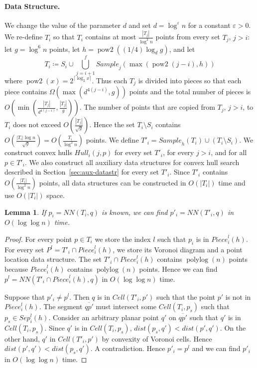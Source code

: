 \documentclass[12pt,a4paper,USenglish,cleveref, autoref, thm-restate]{article}
\newcommand{\ov}[1]{\overline{#1}}
\newcommand{\Cell}{\mathit{Cell}}
\newcommand{\Sample}{\mathit{Sample}}
\newcommand{\Piece}{\mathit{Piece}}
\newcommand{\Sep}{\mathit{Sep}}
\newcommand{\Hull}{\mathit{Hull}}
\newcommand{\NN}{\mathit{NN}}
\newcommand{\eps}{\varepsilon}
\newcommand{\john}[1]{\textcolor{red}{#1}}
\newtheorem{lemma}{Lemma}
\newcommand{\ov}[1]{\overline{#1}}
\newcommand{\Cell}{\mathit{Cell}}
\newcommand{\Sample}{\mathit{Sample}}
\newcommand{\Piece}{\mathit{Piece}}
\newcommand{\Sep}{\mathit{Sep}}
\newcommand{\Hull}{\mathit{Hull}}
\newcommand{\NN}{\mathit{NN}}
\newcommand{\eps}{\varepsilon}
\newcommand{\john}[1]{\textcolor{red}{#1}}
\newcommand{\ov}[1]{\overline{#1}}
\newcommand{\Cell}{\mathit{Cell}}
\newcommand{\Sample}{\mathit{Sample}}
\newcommand{\Piece}{\mathit{Piece}}
\newcommand{\Sep}{\mathit{Sep}}
\newcommand{\Hull}{\mathit{Hull}}
\newcommand{\NN}{\mathit{NN}}
\newcommand{\eps}{\varepsilon}
\newcommand{\john}[1]{\textcolor{red}{#1}}
\begin{document}
\paragraph*{Data Structure.}
We change the value of the parameter $d$ and set $d=\log^{\eps} n$ for a constant $\eps>0$. We re-define $T_i$ so that $T_i$ contains at most $\frac{|T_j|}{\log^3 n}$ points from every  set $T_j$, $j>i$: %
let  $g=\log^6 n$ points, let $h=\operatorname{pow2}((1/4)\log_d g)$, and let $$ T_i \coloneqq S_i \cup \bigcup_{j=i+1}^{f} \Sample_j(\max(\operatorname{pow2}(j-i),h))$$ where $\operatorname{pow2}(x)=2^{\lceil\log_2 x\rceil}$. Thus each $T_j$ is divided into  pieces so that each piece contains $\Omega(\max(d^{4(j-i)},g))$ points and the total number of pieces is  $O(\min(\frac{|T_j|}{d^{4(j-i)}},\frac{|T_j|}{g}))$. The number of points  that are copied from $T_j$, $j>i$,  to $T_i$ does not exceed  $O(\frac{|T_j|}{\sqrt{g}})$. Hence the set  $T_i\setminus S_i$ contains $O(\frac{|T_i|\log n}{\sqrt{g}})=O(\frac{T_i}{\log^2 n})$ points. 
We define $T'_i= \Sample_h(T_i)\cup (T_i\setminus S_i)$. We construct convex hulls $\Hull_i(j,p)$ for every set $T'_i$, for every $j>i$, and for all $p\in T'_i$. We also construct all auxiliary data  structures for convex hull search described in Section~\ref{sec:aux-datastr} for every set $T'_i$. Since $T'_i$ contains $O(\frac{|T_i|}{\log^2n})$ points, all data structures can be constructed in $O(|T_i|)$ time and use $O(|T_i|)$ space. %

\begin{lemma}
  \label{lemma:tprime}
  If $p_i=\NN(T_i,q)$ is known, we can find $p'_i=\NN(T'_i,q)$ in $O(\log \log n)$ time. 
\end{lemma}
\begin{proof}
  For every point $p\in T_i$ we store the index $l$ such that $p_i$ is in $ \Piece^l_i(h)$. For every set
  $P^l=T'_i\cap \Piece^l_i(h)$, we store its Voronoi diagram and a point location data structure. The set $T'_i\cap \Piece^l_i(h)$ contains $\operatorname{polylog}(n)$ points because $\Piece^l_i(h)$ contains $\operatorname{polylog}(n)$ points. Hence we can find  $p^l=\NN(T'_i\cap \Piece^l_i(h),q)$ in $O(\log\log n)$ time. 

  Suppose that $p'_i\not=p^l$. Then $q$ is in $\Cell(T'_i,p')$ such that the point $p'$ is not in $\Piece^l_i(h)$. The segment $\ov{qp'}$ must intersect some $\Cell(T_i,p_s)$ such that $p_s\in \Sep^{l}_i(h)$. Consider an arbitrary planar point $q'$ on  $\ov{qp'}$ such that $q'$ is in $\Cell(T_i,p_s)$. Since $q'$ is in $\Cell(T_i,p_s)$,  $dist(p_s,q')< dist(p',q')$. On the other hand, $q'$ in $\Cell(T'_i,p')$ by convexity of Voronoi cells. Hence   $dist(p',q')< dist(p_s,q')$. A contradiction. 
Hence $p'_i=p^l$ and we can find $p'_i$  in $O(\log\log n)$ time. 
\end{proof}
\end{document}
